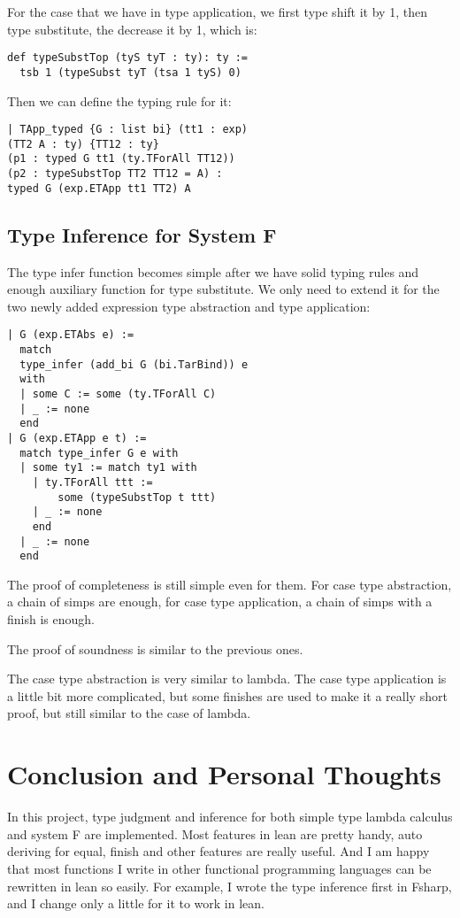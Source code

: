 \documentclass[conference]{IEEEtran}
\begin{document}
For the case that we have in type application, we first type shift
it by 1, then type substitute, the decrease it by 1, which is:
\begin{lstlisting}
def typeSubstTop (tyS tyT : ty): ty :=
  tsb 1 (typeSubst tyT (tsa 1 tyS) 0)
\end{lstlisting}

Then we can define the typing rule for it:
\begin{lstlisting}
| TApp_typed {G : list bi} (tt1 : exp) 
(TT2 A : ty) {TT12 : ty} 
(p1 : typed G tt1 (ty.TForAll TT12)) 
(p2 : typeSubstTop TT2 TT12 = A) : 
typed G (exp.ETApp tt1 TT2) A
\end{lstlisting}

\subsection{Type Inference for System F}
The type infer function becomes simple after we
have solid typing rules and enough auxiliary function
for type substitute. We only need to extend it for the
two newly added expression type abstraction and type
application:

\begin{lstlisting}
| G (exp.ETAbs e) :=
  match 
  type_infer (add_bi G (bi.TarBind)) e 
  with
  | some C := some (ty.TForAll C)
  | _ := none
  end
| G (exp.ETApp e t) :=
  match type_infer G e with
  | some ty1 := match ty1 with
    | ty.TForAll ttt := 
        some (typeSubstTop t ttt)
    | _ := none
    end
  | _ := none
  end

\end{lstlisting}

The proof of completeness is still simple even
for them. For case type abstraction, a chain of
simps are enough, for case type application, a
chain of simps with a finish is enough.

The proof of soundness is similar to the previous ones.

The case type abstraction is very similar to lambda.
The case type application is a little bit more complicated, but
some finishes are used to make it a really short proof, but
still similar to the case of lambda.

\section{Conclusion and Personal Thoughts}
In this project, type judgment and inference for both simple type lambda calculus and system F are implemented.
Most features in lean are pretty handy, auto deriving for equal, finish and other features are really useful.
And I am happy that most functions I write in other functional programming languages can be rewritten in lean so
easily. For example, I wrote the type inference first in Fsharp, and I change only a little for it to work in lean.
\end{document}
